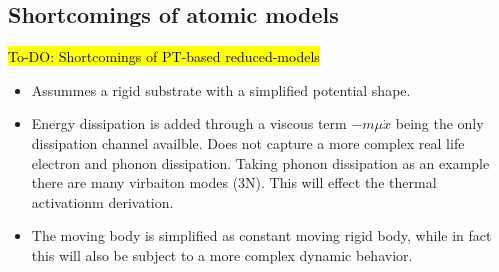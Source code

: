 



\subsection{Shortcomings of atomic models}
\hl{To-DO: Shortcomings of PT-based reduced-models} %
\begin{itemize}
  \item Assummes a rigid substrate with a simplified potential shape. 
  \item Energy dissipation is added through a viscous term $-m\mu \dot{x}$ being the only dissipation channel availble. Does not capture a more complex real life electron and phonon dissipation. Taking phonon dissipation as an example there are many virbaiton modes (3N). This will effect the thermal activationm derivation. 
  \item The moving body is simplified as constant moving rigid body, while in fact this will also be subject to a more complex dynamic behavior.
\end{itemize}






